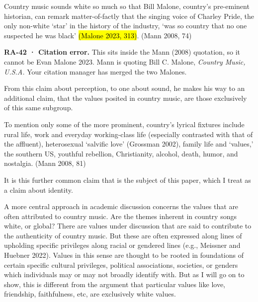 \documentclass[
  letterpaper,
  DIV=11,
  numbers=noendperiod]{scrartcl}
\theoremstyle{remark}
\begin{document}
Country music sounds white so much so that Bill Malone, country's
pre-eminent historian, can remark matter-of-factly that the singing
voice of Charley Pride, the only non-white `star' in the history of the
industry, `was so country that no one suspected he was black'
\hl{(Malone 2023, 313)}. (Mann 2008, 74)

\begin{tcolorbox}[enhanced jigsaw, arc=.35mm, bottomrule=.15mm, bottomtitle=1mm, breakable, colback=white, colbacktitle=quarto-callout-warning-color!10!white, colframe=quarto-callout-warning-color-frame, coltitle=black, left=2mm, leftrule=.75mm, opacityback=0, opacitybacktitle=0.6, rightrule=.15mm, title=\textcolor{quarto-callout-warning-color}{\faExclamationTriangle}\hspace{0.5em}{Warning}, titlerule=0mm, toprule=.15mm, toptitle=1mm]

\textbf{RA-42 · Citation error.} This sits inside the Mann (2008)
quotation, so it cannot be Evan Malone 2023. Mann is quoting Bill C.
Malone, \emph{Country Music, U.S.A.} Your citation manager has merged
the two Malones.

\end{tcolorbox}

From this claim about perception, to one about sound, he makes his way
to an additional claim, that the values posited in country music, are
those exclusively of this same subgroup.

To mention only some of the more prominent, country's lyrical fixtures
include rural life, work and everyday working-class life (especially
contrasted with that of the affluent), heterosexual `salvific love'
(Grossman 2002), family life and `values,' the southern US, youthful
rebellion, Christianity, alcohol, death, humor, and nostalgia. (Mann
2008, 81)

It is this further common claim that is the subject of this paper, which
I treat as a claim about identity.

A more central approach in academic discussion concerns the values that
are often attributed to country music. Are the themes inherent in
country songs white, or global? There are values under discussion that
are said to contribute to the authenticity of country music. But these
are often expressed along lines of upholding specific privileges along
racial or gendered lines (e.g., Meissner and Huebner 2022). Values in
this sense are thought to be rooted in foundations of certain specific
cultural privileges, political associations, societies, or genders which
individuals may or may not broadly identify with. But as I will go on to
show, this is different from the argument that particular values like
love, friendship, faithfulness, etc, are exclusively white values.
\end{document}
